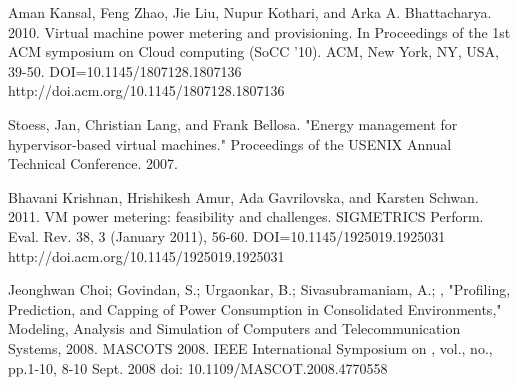 \documentclass[singlecolumn,letterpaper,12pt]{article}
\begin{document}
\begin{thebibliography}{99}
Aman Kansal, Feng Zhao, Jie Liu, Nupur Kothari, and Arka A. Bhattacharya. 2010. Virtual machine power metering and provisioning. In Proceedings of the 1st ACM symposium on Cloud computing (SoCC '10). ACM, New York, NY, USA, 39-50. DOI=10.1145/1807128.1807136 http://doi.acm.org/10.1145/1807128.1807136

Stoess, Jan, Christian Lang, and Frank Bellosa. "Energy management for hypervisor-based virtual machines." Proceedings of the USENIX Annual Technical Conference. 2007.

Bhavani Krishnan, Hrishikesh Amur, Ada Gavrilovska, and Karsten Schwan. 2011. VM power metering: feasibility and challenges. SIGMETRICS Perform. Eval. Rev. 38, 3 (January 2011), 56-60. DOI=10.1145/1925019.1925031 http://doi.acm.org/10.1145/1925019.1925031

Jeonghwan Choi; Govindan, S.; Urgaonkar, B.; Sivasubramaniam, A.; , "Profiling, Prediction, and Capping of Power Consumption in Consolidated Environments," Modeling, Analysis and Simulation of Computers and Telecommunication Systems, 2008. MASCOTS 2008. IEEE International Symposium on , vol., no., pp.1-10, 8-10 Sept. 2008
doi: 10.1109/MASCOT.2008.4770558

\end{thebibliography}
\end{document}
